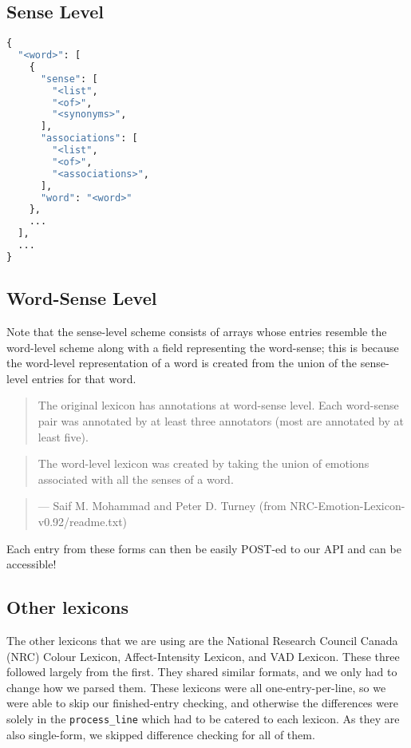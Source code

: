 \documentclass[11pt, twoside, reqno]{book}
\begin{document}
\subsection{Sense Level}
\begin{lstlisting}[language=Python]
{
  "<word>": [
    {
      "sense": [
        "<list",
        "<of>",
        "<synonyms>",
      ],
      "associations": [
        "<list",
        "<of>",
        "<associations>",
      ],
      "word": "<word>"
    },
    ...
  ],
  ...
}
\end{lstlisting}

\subsection{Word-Sense Level}

Note that the sense-level scheme consists of arrays whose entries resemble the word-level scheme along with a field representing the word-sense; this is because the word-level representation of a word is created from the union of the sense-level entries for that word.

\begin{quote}
The original lexicon has annotations at word-sense level. Each word-sense pair was annotated by at least three annotators (most are annotated by at least five).
\end{quote}

\begin{quote}
The word-level lexicon was created by taking the union of emotions associated with all the senses of a word.
\end{quote}

\begin{quote}
— Saif M. Mohammad and Peter D. Turney (from NRC-Emotion-Lexicon-v0.92/readme.txt)
\end{quote}

Each entry from these forms can then be easily POST-ed to our API and can be accessible!

\subsection{Other lexicons}

The other lexicons that we are using are the National Research Council Canada (NRC) Colour Lexicon, Affect-Intensity Lexicon, and VAD Lexicon. These three followed largely from the first. They shared similar formats, and we only had to change how we parsed them. These lexicons were all one-entry-per-line, so we were able to skip our finished-entry checking, and otherwise the differences were solely in the \texttt{process\_line} which had to be catered to each lexicon. As they are also single-form, we skipped difference checking for all of them.
\end{document}

